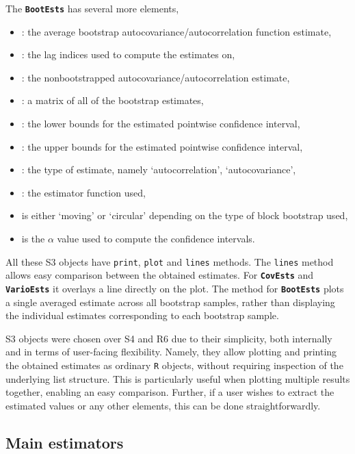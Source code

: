The \textbf{\texttt{BootEsts}} has several more elements,

\begin{itemize}
\item
  : the average bootstrap autocovariance/autocorrelation
  function estimate,
\item
  : the lag indices used to compute the estimates on,
\item
  : the nonbootstrapped autocovariance/autocorrelation
  estimate,
\item
  : a matrix of all of the bootstrap estimates,
\item
  : the lower bounds for the estimated pointwise
  confidence interval,
\item
  : the upper bounds for the estimated pointwise
  confidence interval,
\item
  : the type of estimate, namely `autocorrelation',
  `autocovariance',
\item
  : the estimator function used,
\item
   is either `moving' or `circular' depending on the
  type of block bootstrap used,
\item
   is the \(\alpha\) value used to compute the confidence
  intervals.
\end{itemize}

All these S3 objects have \texttt{print}, \texttt{plot} and
\texttt{lines} methods. The \texttt{lines} method allows easy comparison
between the obtained estimates. For \textbf{\texttt{CovEsts}} and
\textbf{\texttt{VarioEsts}} it overlays a line directly on the plot. The
 method for \textbf{\texttt{BootEsts}} plots a single
averaged estimate across all bootstrap samples, rather than displaying
the individual estimates corresponding to each bootstrap sample.

S3 objects were chosen over S4 and R6 due to their simplicity, both
internally and in terms of user-facing flexibility. Namely, they allow
plotting and printing the obtained estimates as ordinary \texttt{R}
objects, without requiring inspection of the underlying list structure.
This is particularly useful when plotting multiple results together,
enabling an easy comparison. Further, if a user wishes to extract the
estimated values or any other elements, this can be done
straightforwardly.

\subsection{Main estimators}\label{main-estimators}

